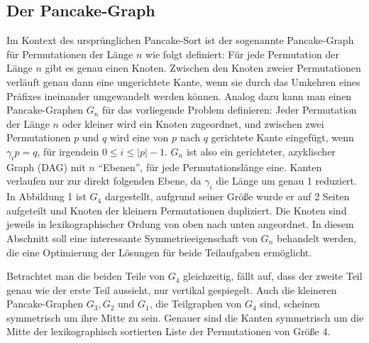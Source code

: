 \documentclass[a4paper, 10pt, ngerman]{article}
\begin{document}
\subsection{Der Pancake-Graph}

Im Kontext des ursprünglichen Pancake-Sort ist der sogenannte Pancake-Graph für Permutationen der Länge $n$ wie folgt definiert: Für jede Permutation der Länge $n$ gibt es genau einen Knoten. Zwischen den Knoten zweier Permutationen verläuft genau dann eine ungerichtete Kante, wenn sie durch das Umkehren eines Präfixes ineinander umgewandelt werden können. Analog dazu kann man einen Pancake-Graphen $G_n$ für das vorliegende Problem definieren: Jeder Permutation der Länge $n$ oder kleiner wird ein Knoten zugeordnet, und zwischen zwei Permutationen $p$ und $q$ wird eine von $p$ nach $q$ gerichtete Kante eingefügt, wenn $\gamma_i p = q$, für irgendein $0 \le i \le |p|-1$. $G_n$ ist also ein gerichteter, azyklischer Graph (DAG) mit $n$ ``Ebenen'', für jede Permutationslänge eine. Kanten verlaufen nur zur direkt folgenden Ebene, da $\gamma_i$ die Länge um genau 1 reduziert. In Abbildung 1 ist $G_4$ dargestellt, aufgrund seiner Größe wurde er auf 2 Seiten aufgeteilt und Knoten der kleinern Permutationen dupliziert. Die Knoten sind jeweils in lexikographischer Ordung von oben nach unten angeordnet. In diesem Abschnitt soll eine interessante Symmetrieeigenschaft von $G_n$ behandelt werden, die eine Optimierung der Lösungen für beide Teilaufgaben ermöglicht.

Betrachtet man die beiden Teile von $G_4$ gleichzeitig, fällt auf, dass der zweite Teil genau wie der erste Teil aussieht, nur vertikal gespiegelt. Auch die kleineren Pancake-Graphen $G_3, G_2$ und $G_1$, die Teilgraphen von $G_4$ sind, scheinen symmetrisch um ihre Mitte zu sein. Genauer sind die Kanten symmetrisch um die Mitte der lexikographisch sortierten Liste der Permutationen von Größe 4.
\end{document}
